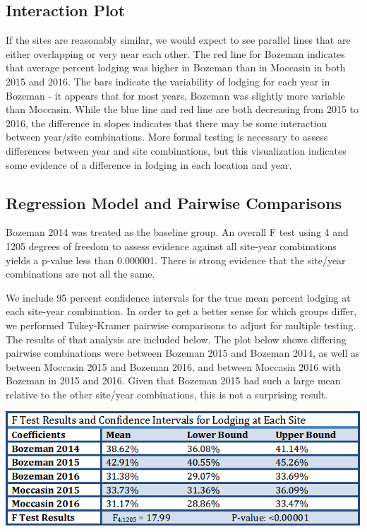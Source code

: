 \documentclass[11pt]{article}\usepackage[]{graphicx}\usepackage[]{color}
\begin{document}
\subsection{Interaction Plot}
If the sites are reasonably similar, we would expect to see parallel lines that are either overlapping or very near each other.  The red line for Bozeman indicates that average percent lodging was higher in Bozeman than in Moccasin in both 2015 and 2016.  The bars indicate the variability of lodging for each year in Bozeman - it appears that for most years, Bozeman was slightly more variable than Moccasin. While the blue line and red line are both decreasing from 2015 to 2016, the difference in slopes indicates that there may be some interaction between year/site combinations.  More formal testing is necessary to assess differences between year and site combinations, but this visualization indicates some evidence of a difference in lodging in each location and year.


\pagebreak
\subsection{Regression Model and Pairwise Comparisons}
Bozeman 2014 was treated as the baseline group. An overall F test using 4 and 1205 degrees of freedom to assess evidence against all site-year combinations yields a p-value less than 0.000001. There is strong evidence that the site/year combinations are not all the same. 
  
We include 95 percent confidence intervals for the true mean percent lodging at each site-year combination. In order to get a better sense for which groups differ, we performed Tukey-Kramer pairwise comparisons to adjust for multiple testing. The results of that analysis are included below. The plot below shows differing pairwise combinations were between Bozeman 2015 and Bozeman 2014, as well as between Moccasin 2015 and Bozeman 2016, and between Moccasin 2016 with Bozeman in 2015 and 2016. Given that Bozeman 2015 had such a large mean relative to the other site/year combinations, this is not a surprising result. 
  
\includegraphics [width = 6.5in] {RegressionResults}
\end{document}
